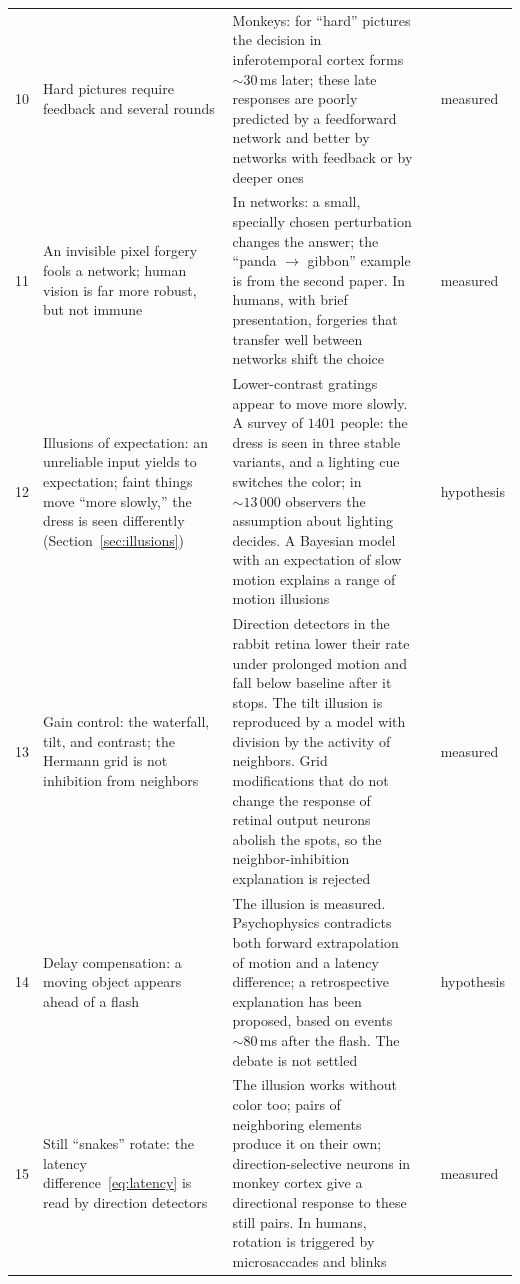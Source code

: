{\begin{longtable}{>{\raggedright}p{0.5cm}>{\raggedright}p{4.0cm}>{\raggedright}p{5.6cm}>{\raggedright}p{2.3cm}>{\raggedright\arraybackslash}p{1.7cm}}
10 & Hard pictures require feedback and several rounds & Monkeys: for ``hard'' pictures the decision in inferotemporal cortex forms $\sim30$\,ms later; these late responses are poorly predicted by a feedforward network and better by networks with feedback or by deeper ones & \cite{Kar2019} & measured \\
11 & An invisible pixel forgery fools a network; human vision is far more robust, but not immune & In networks: a small, specially chosen perturbation changes the answer; the ``panda $\to$ gibbon'' example is from the second paper. In humans, with brief presentation, forgeries that transfer well between networks shift the choice & \cite{Szegedy2014,Goodfellow2015,Elsayed2018} & measured \\
12 & Illusions of expectation: an unreliable input yields to expectation; faint things move ``more slowly,'' the dress is seen differently (Section~\ref{sec:illusions}) & Lower-contrast gratings appear to move more slowly. A survey of $1401$ people: the dress is seen in three stable variants, and a lighting cue switches the color; in $\sim13\,000$ observers the assumption about lighting decides. A Bayesian model with an expectation of slow motion explains a range of motion illusions & \cite{Thompson1982,LaferSousa2015,Wallisch2017,Weiss2002,Purves2011} & hypothesis \\
13 & Gain control: the waterfall, tilt, and contrast; the Hermann grid is not inhibition from neighbors & Direction detectors in the rabbit retina lower their rate under prolonged motion and fall below baseline after it stops. The tilt illusion is reproduced by a model with division by the activity of neighbors. Grid modifications that do not change the response of retinal output neurons abolish the spots, so the neighbor-inhibition explanation is rejected & \cite{BarlowHill1963,Schwartz2009,SchillerCarvey2005} & measured \\
14 & Delay compensation: a moving object appears ahead of a flash & The illusion is measured. Psychophysics contradicts both forward extrapolation of motion and a latency difference; a retrospective explanation has been proposed, based on events $\sim80$\,ms after the flash. The debate is not settled & \cite{Nijhawan1994,EaglemanSejnowski2000} & hypothesis \\
15 & Still ``snakes'' rotate: the latency difference~\eqref{eq:latency} is read by direction detectors & The illusion works without color too; pairs of neighboring elements produce it on their own; direction-selective neurons in monkey cortex give a directional response to these still pairs. In humans, rotation is triggered by microsaccades and blinks & \cite{Conway2005,OteroMillan2012} & measured \\

\end{longtable}}
